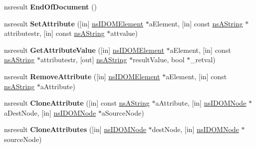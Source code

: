 \begin{DoxyCompactItemize}
nsresult {\bfseries End\+Of\+Document} ()
\item 
\mbox{\label{interfacens_i_editor_a0577865ff0e0d9ad05e9c1733adea647}} 
nsresult {\bfseries Set\+Attribute} (\mbox{[}in\mbox{]} \hyperlink{interfacens_i_d_o_m_element}{ns\+I\+D\+O\+M\+Element} $\ast$a\+Element, \mbox{[}in\mbox{]} const \hyperlink{structns_string_container}{ns\+A\+String} $\ast$attributestr, \mbox{[}in\mbox{]} const \hyperlink{structns_string_container}{ns\+A\+String} $\ast$attvalue)
\item 
\mbox{\label{interfacens_i_editor_a21a5645463af04a57f55e24910e31648}} 
nsresult {\bfseries Get\+Attribute\+Value} (\mbox{[}in\mbox{]} \hyperlink{interfacens_i_d_o_m_element}{ns\+I\+D\+O\+M\+Element} $\ast$a\+Element, \mbox{[}in\mbox{]} const \hyperlink{structns_string_container}{ns\+A\+String} $\ast$attributestr, \mbox{[}out\mbox{]} \hyperlink{structns_string_container}{ns\+A\+String} $\ast$result\+Value, bool $\ast$\+\_\+retval)
\item 
\mbox{\label{interfacens_i_editor_a8dcef42f65c7716ea5f4e9e0825b91ed}} 
nsresult {\bfseries Remove\+Attribute} (\mbox{[}in\mbox{]} \hyperlink{interfacens_i_d_o_m_element}{ns\+I\+D\+O\+M\+Element} $\ast$a\+Element, \mbox{[}in\mbox{]} const \hyperlink{structns_string_container}{ns\+A\+String} $\ast$a\+Attribute)
\item 
\mbox{\label{interfacens_i_editor_aa325318167c75e284e7e7c490598fc17}} 
nsresult {\bfseries Clone\+Attribute} (\mbox{[}in\mbox{]} const \hyperlink{structns_string_container}{ns\+A\+String} $\ast$a\+Attribute, \mbox{[}in\mbox{]} \hyperlink{interfacens_i_d_o_m_node}{ns\+I\+D\+O\+M\+Node} $\ast$a\+Dest\+Node, \mbox{[}in\mbox{]} \hyperlink{interfacens_i_d_o_m_node}{ns\+I\+D\+O\+M\+Node} $\ast$a\+Source\+Node)
\item 
\mbox{\label{interfacens_i_editor_a953a1b6ed4fa67fbd11a98b18ad729db}} 
nsresult {\bfseries Clone\+Attributes} (\mbox{[}in\mbox{]} \hyperlink{interfacens_i_d_o_m_node}{ns\+I\+D\+O\+M\+Node} $\ast$dest\+Node, \mbox{[}in\mbox{]} \hyperlink{interfacens_i_d_o_m_node}{ns\+I\+D\+O\+M\+Node} $\ast$source\+Node)
\item 
\mbox{\label{interfacens_i_editor_a5c4ed70f1bda527f00dc04612d7d392b}} 

\end{DoxyCompactItemize}
